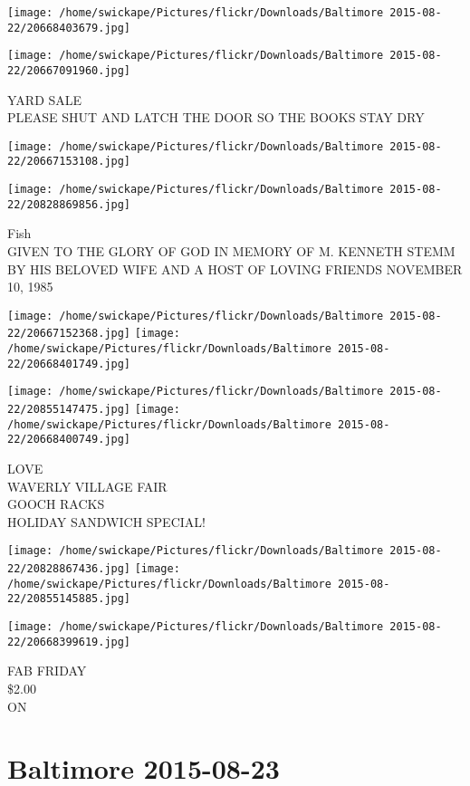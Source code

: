 \documentclass[10pt,letterpaper]{article}
\begin{document}
\texttt{[image: /home/swickape/Pictures/flickr/Downloads/Baltimore 2015-08-22/20668403679.jpg]}

\vspace{0.25in}
\texttt{[image: /home/swickape/Pictures/flickr/Downloads/Baltimore 2015-08-22/20667091960.jpg]}

YARD SALE\\
PLEASE SHUT AND LATCH THE DOOR SO THE BOOKS STAY DRY
\pagebreak

\texttt{[image: /home/swickape/Pictures/flickr/Downloads/Baltimore 2015-08-22/20667153108.jpg]}

\vspace{0.25in}
\texttt{[image: /home/swickape/Pictures/flickr/Downloads/Baltimore 2015-08-22/20828869856.jpg]}

Fish\\
GIVEN TO THE GLORY OF GOD IN MEMORY OF M. KENNETH STEMM BY HIS BELOVED WIFE AND A HOST OF LOVING FRIENDS NOVEMBER 10, 1985
\pagebreak

\texttt{[image: /home/swickape/Pictures/flickr/Downloads/Baltimore 2015-08-22/20667152368.jpg]}
\texttt{[image: /home/swickape/Pictures/flickr/Downloads/Baltimore 2015-08-22/20668401749.jpg]}

\texttt{[image: /home/swickape/Pictures/flickr/Downloads/Baltimore 2015-08-22/20855147475.jpg]}
\texttt{[image: /home/swickape/Pictures/flickr/Downloads/Baltimore 2015-08-22/20668400749.jpg]}

LOVE\\
WAVERLY VILLAGE FAIR\\
GOOCH RACKS\\
HOLIDAY SANDWICH SPECIAL!
\pagebreak

\texttt{[image: /home/swickape/Pictures/flickr/Downloads/Baltimore 2015-08-22/20828867436.jpg]}
\texttt{[image: /home/swickape/Pictures/flickr/Downloads/Baltimore 2015-08-22/20855145885.jpg]}

\texttt{[image: /home/swickape/Pictures/flickr/Downloads/Baltimore 2015-08-22/20668399619.jpg]}

FAB FRIDAY\\
\$2.00\\
ON
\pagebreak

\section*{Baltimore 2015-08-23}
\end{document}
